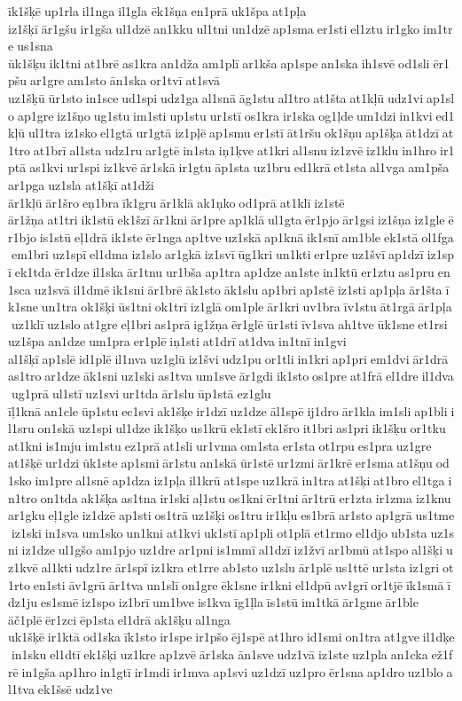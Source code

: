 īk1šķē up1rla il1nga il1gla 	ēk1šņa en1prā uk1špa at1pļa 	iz1šķī ār1gšu ir1gša ul1dzē an1kku ul1tni un1dzē ap1sma er1sti el1ztu ir1gko im1tre us1sna 	ūk1šķu ik1tni at1brē as1kra an1dža am1plī ar1kša ap1spe an1ska ih1svē od1sli ēr1pšu ar1gre am1sto ān1ska or1tvī at1svā 	uz1šķū ūr1sto in1sce ud1spi udz1ga al1snā āg1stu al1tro at1šta at1kļū udz1vi ap1slo ap1gre iz1šņo ug1stu im1sti up1stu ur1stī os1kra ir1ska og1ļde um1dzi in1kvi ed1kļū ul1tra iz1sko el1gtā ur1gtā iz1pļē ap1smu er1stī āt1ršu ok1šņu ap1šķa āt1dzī at1tro at1brī al1sta udz1ru ar1gtē in1sta iņ1ķve at1kri al1snu iz1zvē iz1klu in1hro ir1ptā as1kvi ur1spi iz1kvē ār1skā ir1gtu āp1sta uz1bru ed1krā et1sta al1vga am1pša ar1pga uz1sla 	at1šķī at1dži 	ār1kļū ār1šro eņ1bra īk1gru ār1klā ak1ņko od1prā at1klī iz1stē 	ār1žņa at1tri ik1stū ek1šzī ār1kni ār1pre ap1klā ul1gta ēr1pjo ār1gsi iz1šņa iz1gle ēr1bjo is1stū eļ1drā ik1ste ēr1nga ap1tve uz1skā ap1knā ik1snī am1ble ek1stā ol1fga em1bri uz1spī el1dma iz1slo ar1gkā iz1svī ūg1kri un1kti er1pre uz1švī ap1dzī iz1spī ek1tda ēr1dze il1ska ār1tnu ur1bša ap1tra ap1dze an1ste in1ktū er1ztu as1pru en1sca uz1svā il1dmē ik1sni ār1brē āk1sto āk1slu ap1bri ap1stē iz1sti ap1pļa ār1šta īk1sne un1tra ok1šķi ūs1tni ok1trī iz1glā om1ple ār1kri uv1bra īv1stu āt1rgā ār1pļa uz1klī uz1slo at1gre eļ1bri as1prā ig1žņa ēr1glē ūr1sti īv1sva ah1tve ūk1sne et1rsi uz1špa an1dze um1pra er1plē iņ1sti at1drī at1dva in1tnī in1gvi 	al1šķī ap1slē id1plē il1nva uz1glū iz1švi udz1pu or1tli in1kri ap1pri em1dvi ār1drā as1tro ar1dze āk1sni uz1ski as1tva um1sve ār1gdi ik1sto os1pre at1frā el1dre il1dva ug1prā ul1stī uz1svi ur1tda ār1slu ūp1stā ez1glu 	īļ1knā an1cle ūp1stu ec1svi ak1šķe ir1dzī uz1dze āl1spē ij1dro ār1kla im1sli ap1bli il1sru on1skā uz1spi ul1dze ik1šķo us1krū ek1stī ek1šro it1bri as1pri ik1šķu or1tku at1kni is1mju im1stu ez1prā at1sli ur1vma om1sta er1sta ot1rpu es1pra uz1gre 	at1šķē ur1dzi ūk1ste ap1smi ār1stu an1skā ūr1stē ur1zmi ār1krē er1sma at1šņu od1sko im1pre al1snē ap1dza iz1pļa il1krū at1spe uz1krā in1tra at1šķi at1bro el1tga in1tro on1tda ak1šķa as1tna ir1ski aļ1stu os1kni ēr1tni ār1trū er1zta ir1zma iz1knu ar1gku eļ1gle iz1dzē ap1sti os1trā uz1šķi os1tru ir1kļu es1brā ar1sto ap1grā us1tme iz1ski in1sva um1sko un1kni at1kvi uk1stī ap1pli ot1plā et1rmo el1djo ub1sta uz1sni iz1dze ul1gšo am1pjo uz1dre ar1pni is1mmī al1dzī iz1žvī ar1bmū at1spo al1šķi uz1kvē al1kti udz1re ār1spī iz1kra et1rre ab1sto uz1slu ār1plē us1ttē ur1sta iz1gri ot1rto en1sti āv1grū ār1tva un1slī on1gre ēk1sne ir1kni el1dpū av1grī or1tjē īk1smā īdz1ju es1smē iz1spo iz1brī um1bve is1kva īg1ļla īs1stū im1tkā ār1gme ār1ble 	āč1plē ēr1zci ēp1sta el1drā ak1šķu al1nga 	uk1šķē ir1ktā od1ska īk1sto ir1spe ir1pšo ēj1spē at1hro id1smi on1tra at1gve il1dķe in1sku el1dtī ek1šķi uz1kre ap1zvē ār1ska ān1sve udz1vā iz1ste uz1pla an1cka ež1frē in1gša ap1hro in1gtī ir1mdi ir1mva ap1svi uz1dzī uz1pro ēr1sna ap1dro uz1blo al1tva ek1šsē udz1ve 
